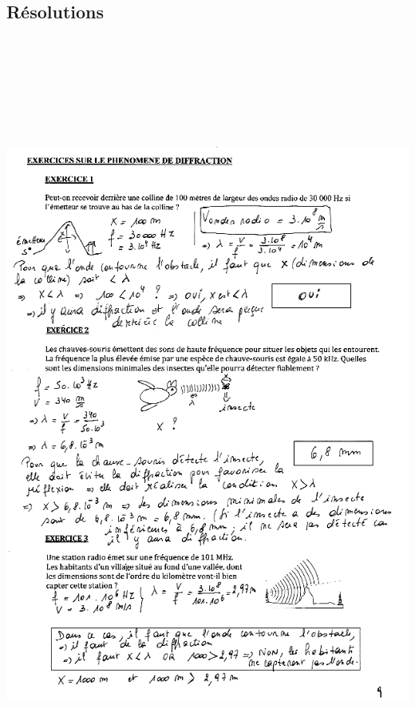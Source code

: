 {\subsection{Résolutions}
\includegraphics[width=18.503cm,height=25.615cm]{Pictures/100000010000026F0000035E638B1FB4AD6FDEB0.png}

}
